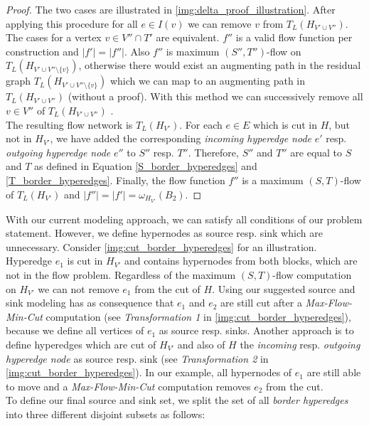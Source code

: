 \begin{proof}
The two cases are illustrated in \autoref{img:delta_proof_illustration}.
After applying this procedure for all $e \in I(v)$ we can remove $v$ from $T_L(H_{V' \cup V''})$. 
The cases for a vertex $v \in V'' \cap T'$ are equivalent. 
$f''$ is a valid flow function per construction and $|f'| = |f''|$. Also $f''$
is maximum $(S'',T'')$-flow on $T_L(H_{V' \cup V''\setminus \{v\}})$, otherwise
there would exist an augmenting path in the residual graph $T_L(H_{V' \cup V''\setminus \{v\}})$
which we can map to an augmenting path in $T_L(H_{V' \cup V''})$ (without a proof). With this method 
we can successively remove all $v \in V''$ of $T_L(H_{V' \cup V''})$ . \\
The resulting  flow network is $T_L(H_{V'})$. For each $e \in E$ which is cut in $H$, but not
in $H_{V'}$, we have added the corresponding \emph{incoming hyperedge node} $e'$
resp. \emph{outgoing hyperedge node} $e''$ to $S''$ resp. $T''$. Therefore, 
$S''$ and $T''$ are equal to $S$ and $T$ as defined in Equation \ref{S_border_hyperedges}
and \ref{T_border_hyperedges}. Finally, the flow function $f''$ is a maximum
$(S,T)$-flow of $T_L(H_{V'})$ and $|f''| = |f'| = \omega_{H_{V'}}(B_2)$.
\end{proof}

With our current modeling approach, we can satisfy all conditions of
our problem statement. However, we define hypernodes as source resp.
sink which are unnecessary. Consider \autoref{img:cut_border_hyperedges} for an illustration.
Hyperedge $e_1$ is cut in $H_{V'}$ and contains hypernodes from both
blocks, which are not in the flow problem. Regardless of the maximum $(S,T)$-flow computation on
$H_{V'}$ we can not remove $e_1$ from the cut of $H$. Using our suggested source and sink modeling 
has as consequence that $e_1$ and $e_2$ are still cut after a \emph{Max-Flow-Min-Cut} 
computation (see \emph{Transformation 1} in \autoref{img:cut_border_hyperedges}), 
because we define all vertices of $e_1$ as source resp. sinks. Another approach
is to define hyperedges which are cut of $H_{V'}$ and also of $H$ the \emph{incoming}
resp. \emph{outgoing hyperedge node} as source resp. sink (see \emph{Transformation 2} in
\autoref{img:cut_border_hyperedges}). In our example, all hypernodes of $e_1$ are still able 
to move and a \emph{Max-Flow-Min-Cut} computation removes $e_2$ from the cut.\\
To define our final source and sink set, we split the set of all \emph{border hyperedges} into
three different disjoint subsets as follows:


